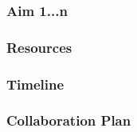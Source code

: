 \documentclass[11pt]{article}
\begin{document}
		\subsubsection{Aim 1...n}

		\subsubsection{Resources}

		\subsubsection{Timeline}

		\subsubsection{Collaboration Plan}
\newpage

% 
% 
% 
\end{document}
